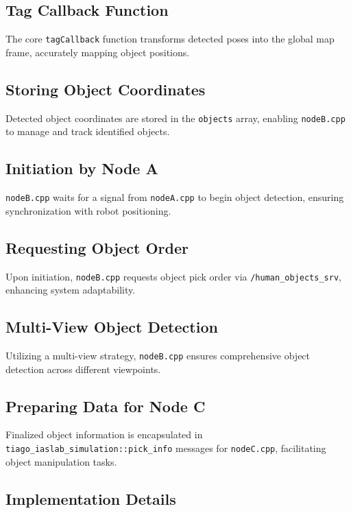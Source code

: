 \documentclass[a4paper]{article}
\begin{document}
\subsection{Tag Callback Function}

The core \texttt{tagCallback} function transforms detected poses into the global map frame, accurately mapping object positions.

\subsection{Storing Object Coordinates}

Detected object coordinates are stored in the \texttt{objects} array, enabling \texttt{nodeB.cpp} to manage and track identified objects.

\subsection{Initiation by Node A}

\texttt{nodeB.cpp} waits for a signal from \texttt{nodeA.cpp} to begin object detection, ensuring synchronization with robot positioning.

\subsection{Requesting Object Order}

Upon initiation, \texttt{nodeB.cpp} requests object pick order via \texttt{/human\_objects\_srv}, enhancing system adaptability.

\subsection{Multi-View Object Detection}

Utilizing a multi-view strategy, \texttt{nodeB.cpp} ensures comprehensive object detection across different viewpoints.

\subsection{Preparing Data for Node C}

Finalized object information is encapsulated in \texttt{tiago\_iaslab\_simulation::pick\_info} messages for \texttt{nodeC.cpp}, facilitating object manipulation tasks.

\subsection{Implementation Details}
\end{document}
